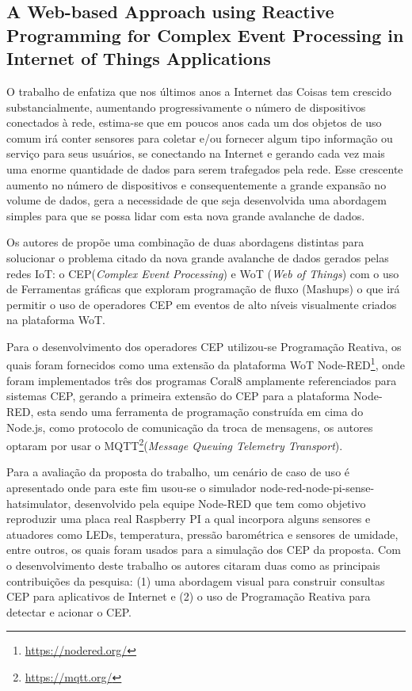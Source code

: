 \documentclass[ti,table]{texufpel} %
\begin{document}
     

  

  

  

\subsection{A Web-based Approach using Reactive Programming for Complex Event Processing in Internet of Things Applications}     

     

    O trabalho de \cite{art2zimmerle2018web} enfatiza que nos últimos anos a Internet das Coisas tem crescido substancialmente, aumentando progressivamente o número de dispositivos conectados à rede, estima-se que em poucos anos cada um dos objetos de uso comum irá conter sensores para coletar e/ou fornecer algum tipo informação ou serviço para seus usuários, se conectando na Internet e gerando cada vez mais uma enorme quantidade de dados para serem trafegados pela rede. Esse crescente aumento no número de dispositivos e consequentemente a grande expansão no volume de dados, gera a necessidade de que seja desenvolvida uma abordagem simples para que se possa lidar com esta nova grande avalanche de dados. 

     

    Os autores de \cite{art2zimmerle2018web} propõe uma combinação de duas abordagens distintas para solucionar o problema citado da nova grande avalanche de dados gerados pelas redes IoT: o CEP(\textit{Complex Event Processing}) e WoT (\textit{Web of Things}) com o uso de Ferramentas gráficas que exploram programação de fluxo (Mashups) o que irá permitir o uso de operadores CEP em eventos de alto níveis visualmente criados na plataforma WoT. 

    Para o desenvolvimento dos operadores CEP utilizou-se Programação Reativa, os quais foram fornecidos como uma extensão da plataforma WoT Node-RED\footnote{\url{https://nodered.org/}}, onde foram implementados três dos programas Coral8 amplamente referenciados para sistemas CEP, gerando a primeira extensão do CEP para a plataforma Node-RED, esta sendo uma ferramenta de programação construída em cima do Node.js, como protocolo de comunicação da troca de mensagens, os autores optaram por usar o MQTT\footnote{\url{https://mqtt.org/}}(\textit{Message Queuing Telemetry Transport}).      

     

    Para a avaliação da proposta do trabalho, um cenário de caso de uso é apresentado onde para este fim usou-se o simulador node-red-node-pi-sense-hatsimulator, desenvolvido pela equipe Node-RED que tem como objetivo reproduzir uma placa real Raspberry PI a qual incorpora alguns sensores e atuadores como LEDs, temperatura, pressão barométrica e sensores de umidade, entre outros, os quais foram usados para a simulação dos CEP da proposta. Com o desenvolvimento deste trabalho os autores citaram duas como as principais contribuições da pesquisa: (1) uma abordagem visual para construir consultas CEP para aplicativos de Internet e (2) o uso de Programação Reativa para detectar e acionar o CEP. 
\end{document}
